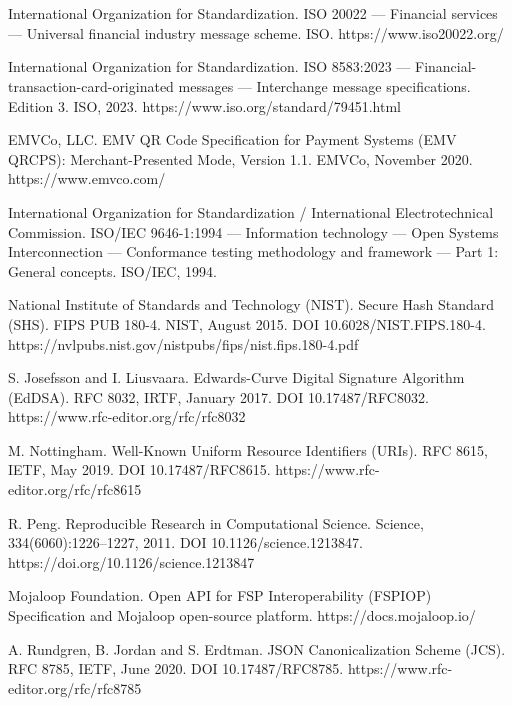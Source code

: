 \documentclass[journal abbreviation, manuscript]{copernicus}
\begin{document}
\section*{\refname}
{\small
\begin{list}{}{%
  \setlength{\labelsep}{0.5em}%
  \setlength{\labelwidth}{1.8em}%
  \setlength{\leftmargin}{2.3em}%
  \setlength{\itemindent}{0pt}%
  \setlength{\itemsep}{3pt}%
  \setlength{\parsep}{0pt}}
\sloppy
\item[{[1]}] International Organization for Standardization. ISO 20022 --- Financial services --- Universal financial industry message scheme. ISO. https://www.iso20022.org/
\item[{[2]}] International Organization for Standardization. ISO 8583:2023 --- Financial-transaction-card-originated messages --- Interchange message specifications. Edition 3. ISO, 2023. https://www.iso.org/standard/79451.html
\item[{[3]}] EMVCo, LLC. EMV QR Code Specification for Payment Systems (EMV QRCPS): Merchant-Presented Mode, Version 1.1. EMVCo, November 2020. https://www.emvco.com/
\item[{[4]}] International Organization for Standardization / International Electrotechnical Commission. ISO/IEC 9646-1:1994 --- Information technology --- Open Systems Interconnection --- Conformance testing methodology and framework --- Part 1: General concepts. ISO/IEC, 1994.
\item[{[5]}] National Institute of Standards and Technology (NIST). Secure Hash Standard (SHS). FIPS PUB 180-4. NIST, August 2015. DOI 10.6028/NIST.FIPS.180-4. https://nvlpubs.nist.gov/nistpubs/fips/nist.fips.180-4.pdf
\item[{[6]}] S. Josefsson and I. Liusvaara. Edwards-Curve Digital Signature Algorithm (EdDSA). RFC 8032, IRTF, January 2017. DOI 10.17487/RFC8032. https://www.rfc-editor.org/rfc/rfc8032
\item[{[7]}] M. Nottingham. Well-Known Uniform Resource Identifiers (URIs). RFC 8615, IETF, May 2019. DOI 10.17487/RFC8615. https://www.rfc-editor.org/rfc/rfc8615
\item[{[8]}] R. Peng. Reproducible Research in Computational Science. Science, 334(6060):1226--1227, 2011. DOI 10.1126/science.1213847. https://doi.org/10.1126/science.1213847
\item[{[9]}] Mojaloop Foundation. Open API for FSP Interoperability (FSPIOP) Specification and Mojaloop open-source platform. https://docs.mojaloop.io/
\item[{[10]}] A. Rundgren, B. Jordan and S. Erdtman. JSON Canonicalization Scheme (JCS). RFC 8785, IETF, June 2020. DOI 10.17487/RFC8785. https://www.rfc-editor.org/rfc/rfc8785
\end{list}}
\end{document}
